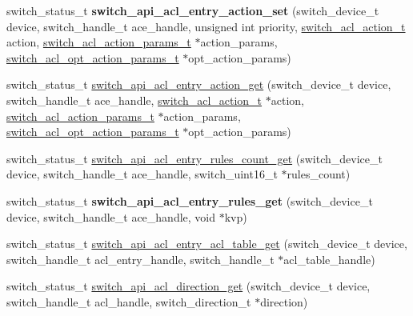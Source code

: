 \begin{DoxyCompactItemize}
\item 
\hypertarget{group__ACL_ga7201941cac9e21bf82635c117a133544}{switch\+\_\+status\+\_\+t {\bfseries switch\+\_\+api\+\_\+acl\+\_\+entry\+\_\+action\+\_\+set} (switch\+\_\+device\+\_\+t device, switch\+\_\+handle\+\_\+t ace\+\_\+handle, unsigned int priority, \hyperlink{group__ACL_ga9e512fe793010aac7829bb2fbef4764d}{switch\+\_\+acl\+\_\+action\+\_\+t} action, \hyperlink{group__ACL_gaf3edf5029fc2da06c40c02beacb8ab21}{switch\+\_\+acl\+\_\+action\+\_\+params\+\_\+t} $\ast$action\+\_\+params, \hyperlink{group__ACL_gaf6629027c512d3f6976b8cd8eba8c4fb}{switch\+\_\+acl\+\_\+opt\+\_\+action\+\_\+params\+\_\+t} $\ast$opt\+\_\+action\+\_\+params)}\label{group__ACL_ga7201941cac9e21bf82635c117a133544}

\item 
switch\+\_\+status\+\_\+t \hyperlink{group__ACL_gac65b50b8e8fddfe1c7e24a1b28fe8d33}{switch\+\_\+api\+\_\+acl\+\_\+entry\+\_\+action\+\_\+get} (switch\+\_\+device\+\_\+t device, switch\+\_\+handle\+\_\+t ace\+\_\+handle, \hyperlink{group__ACL_ga9e512fe793010aac7829bb2fbef4764d}{switch\+\_\+acl\+\_\+action\+\_\+t} $\ast$action, \hyperlink{group__ACL_gaf3edf5029fc2da06c40c02beacb8ab21}{switch\+\_\+acl\+\_\+action\+\_\+params\+\_\+t} $\ast$action\+\_\+params, \hyperlink{group__ACL_gaf6629027c512d3f6976b8cd8eba8c4fb}{switch\+\_\+acl\+\_\+opt\+\_\+action\+\_\+params\+\_\+t} $\ast$opt\+\_\+action\+\_\+params)
\item 
switch\+\_\+status\+\_\+t \hyperlink{group__ACL_ga53d590a58e2045fef2c47bfcc6f6e300}{switch\+\_\+api\+\_\+acl\+\_\+entry\+\_\+rules\+\_\+count\+\_\+get} (switch\+\_\+device\+\_\+t device, switch\+\_\+handle\+\_\+t ace\+\_\+handle, switch\+\_\+uint16\+\_\+t $\ast$rules\+\_\+count)
\item 
\hypertarget{group__ACL_gaf17b253ce2f52be8769e3e1151b56db4}{switch\+\_\+status\+\_\+t {\bfseries switch\+\_\+api\+\_\+acl\+\_\+entry\+\_\+rules\+\_\+get} (switch\+\_\+device\+\_\+t device, switch\+\_\+handle\+\_\+t ace\+\_\+handle, void $\ast$kvp)}\label{group__ACL_gaf17b253ce2f52be8769e3e1151b56db4}

\item 
switch\+\_\+status\+\_\+t \hyperlink{group__ACL_ga7fabbd242b11edfb01725c8c4512227c}{switch\+\_\+api\+\_\+acl\+\_\+entry\+\_\+acl\+\_\+table\+\_\+get} (switch\+\_\+device\+\_\+t device, switch\+\_\+handle\+\_\+t acl\+\_\+entry\+\_\+handle, switch\+\_\+handle\+\_\+t $\ast$acl\+\_\+table\+\_\+handle)
\item 
switch\+\_\+status\+\_\+t \hyperlink{group__ACL_ga271fb6d4b1e3246a95d9276be8514108}{switch\+\_\+api\+\_\+acl\+\_\+direction\+\_\+get} (switch\+\_\+device\+\_\+t device, switch\+\_\+handle\+\_\+t acl\+\_\+handle, switch\+\_\+direction\+\_\+t $\ast$direction)
\end{DoxyCompactItemize}


